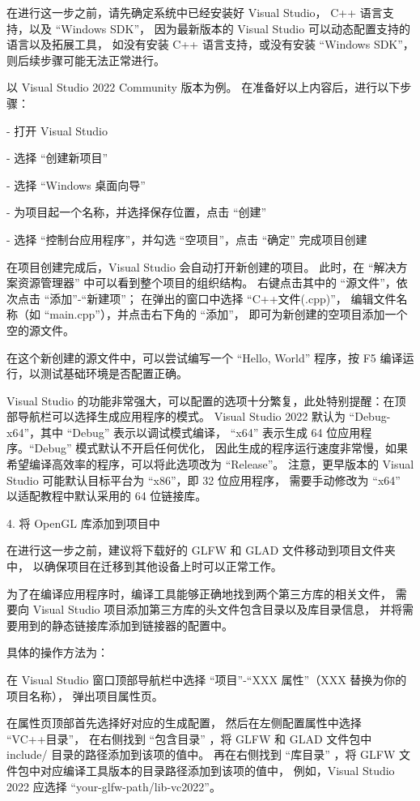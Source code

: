 \documentclass[fontset=windows]{ctexart}
\begin{document}
在进行这一步之前，请先确定系统中已经安装好 Visual Studio， C++ 语言支持，以及 “Windows SDK”，
因为最新版本的 Visual Studio 可以动态配置支持的语言以及拓展工具，
如没有安装 C++ 语言支持，或没有安装 “Windows SDK”，则后续步骤可能无法正常进行。

以 Visual Studio 2022 Community 版本为例。
在准备好以上内容后，进行以下步骤：

- 打开 Visual Studio

- 选择 “创建新项目”

- 选择 “Windows 桌面向导”

- 为项目起一个名称，并选择保存位置，点击 “创建”

- 选择 “控制台应用程序”，并勾选 “空项目”，点击 “确定” 完成项目创建

在项目创建完成后，Visual Studio 会自动打开新创建的项目。
此时，在 “解决方案资源管理器” 中可以看到整个项目的组织结构。
右键点击其中的 “源文件”，依次点击 “添加”-“新建项”；
在弹出的窗口中选择 “C++文件(.cpp)”，
编辑文件名称（如 “main.cpp”），并点击右下角的 “添加”，
即可为新创建的空项目添加一个空的源文件。

在这个新创建的源文件中，可以尝试编写一个 “Hello, World” 程序，按 F5 编译运行，以测试基础环境是否配置正确。

Visual Studio 的功能非常强大，可以配置的选项十分繁复，此处特别提醒：在顶部导航栏可以选择生成应用程序的模式。
Visual Studio 2022 默认为 “Debug-x64”，其中 “Debug” 表示以调试模式编译，
“x64” 表示生成 64 位应用程序。“Debug” 模式默认不开启任何优化，
因此生成的程序运行速度非常慢，如果希望编译高效率的程序，可以将此选项改为 “Release”。
注意，更早版本的 Visual Studio 可能默认目标平台为 “x86”，即 32 位应用程序，
需要手动修改为 “x64” 以适配教程中默认采用的 64 位链接库。

4. 将 OpenGL 库添加到项目中

在进行这一步之前，建议将下载好的 GLFW 和 GLAD 文件移动到项目文件夹中，
以确保项目在迁移到其他设备上时可以正常工作。

为了在编译应用程序时，编译工具能够正确地找到两个第三方库的相关文件，
需要向 Visual Studio 项目添加第三方库的头文件包含目录以及库目录信息，
并将需要用到的静态链接库添加到链接器的配置中。

具体的操作方法为：

在 Visual Studio 窗口顶部导航栏中选择 “项目”-“XXX 属性”（XXX 替换为你的项目名称），
弹出项目属性页。

在属性页顶部首先选择好对应的生成配置，
然后在左侧配置属性中选择 “VC++目录”，
在右侧找到 “包含目录” ，将 GLFW 和 GLAD 文件包中 include/ 目录的路径添加到该项的值中。
再在右侧找到 “库目录” ，将 GLFW 文件包中对应编译工具版本的目录路径添加到该项的值中，
例如，Visual Studio 2022 应选择 “your-glfw-path/lib-vc2022”。
\end{document}
